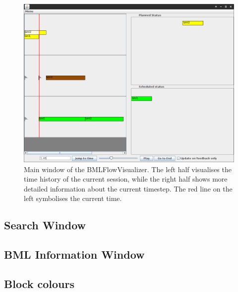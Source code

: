 \documentclass[12pt,a4paper]{article}
\begin{document}
\begin{figure}[H!]
\centering
 \includegraphics[width=\textwidth]{images/bmlFlowOverview.png}
 \caption{Main window of the BMLFlowVisualizer. The left half visualises the time history of the current session, while the right half shows more detailed information
 about the current timestep. The red line on the left symbolises the current time.}
 \label{fig:overview}
\end{figure}

\subsection{Search Window \label{sec:search}}

\subsection{BML Information Window \label{sec:bmlinfo}}

\subsection{Block colours \label{sec:colours}}
\end{document}

